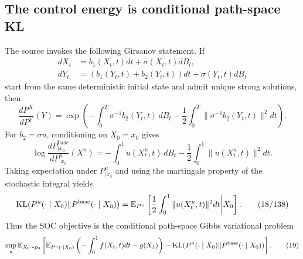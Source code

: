 \subsection{The control energy is conditional path-space KL}
The source invokes the following Girsanov statement.  If
\begin{align*}
 dX_t&=b_1(X_t,t)dt+\sigma(X_t,t)dB_t,\\
 dY_t&=(b_1(Y_t,t)+b_2(Y_t,t))dt+\sigma(Y_t,t)dB_t
\end{align*}
start from the same deterministic initial state and admit unique strong solutions, then
\begin{equation*}
 \frac{dP^X}{dP^Y}(Y)
 =\exp\left(
 -\int_0^T\sigma^{-1}b_2(Y_t,t)\,dB_t
 -\frac12\int_0^T\|\sigma^{-1}b_2(Y_t,t)\|^2dt
 \right).
 \tag{134}
\end{equation*}
For $b_2=\sigma u$, conditioning on $X_0=x_0$ gives
\begin{equation*}
 \log\frac{dP^{\mathrm{base}}_{\mid x_0}}{dP^u_{\mid x_0}}(X^u)
 =-\int_0^1u(X_t^u,t)\,dB_t
 -\frac12\int_0^1\|u(X_t^u,t)\|^2dt.
 \tag{137}
\end{equation*}
Taking expectation under $P^u_{\mid x_0}$ and using the martingale property of the stochastic integral yields
\begin{equation*}
 \mathrm{KL}(P^u(\cdot\mid X_0)\|P^{\mathrm{base}}(\cdot\mid X_0))
 =\mathbb{E}_{P^u}\left[
 \frac12\int_0^1\|u(X_t^u,t)\|^2dt
 \middle|X_0
 \right].
 \tag{18/138}
\end{equation*}
Thus the SOC objective is the conditional path-space Gibbs variational problem
\begin{equation*}
 \sup_u\mathbb{E}_{X_0\sim p_0}\left[
 \mathbb{E}_{P^u(\cdot\mid X_0)}
 \left(-\int_0^1f(X_t,t)dt-g(X_1)\right)
 -\mathrm{KL}(P^u(\cdot\mid X_0)\|P^{\mathrm{base}}(\cdot\mid X_0))
 \right].
 \tag{19}
\end{equation*}

